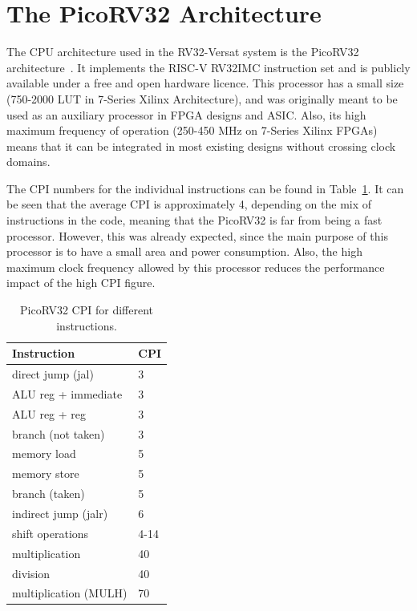 \section{The PicoRV32 Architecture}
\label{section:picorv32}

The \ac{CPU} architecture used in the RV32-Versat system is the PicoRV32
architecture~\cite{cliffordwolf:picorv32}. It implements the RISC-V RV32IMC
instruction set and is publicly available under a free and open hardware
licence. This processor has a small size (750-2000 \ac{LUT} in 7-Series Xilinx
Architecture), and was originally meant to be used as an auxiliary processor in
\ac{FPGA} designs and \ac{ASIC}. Also, its high maximum frequency of operation
(250-450 MHz on 7-Series Xilinx FPGAs) means that it can be integrated in most
existing designs without crossing clock domains.

The \ac{CPI} numbers for the individual instructions can be found in
Table~\ref{tab:cpi}. It can be seen that the average CPI is approximately 4,
depending on the mix of instructions in the code, meaning that the PicoRV32 is
far from being a fast processor. However, this was already expected, since the
main purpose of this processor is to have a small area and power
consumption. Also, the high maximum clock frequency allowed by this processor
reduces the performance impact of the high \ac{CPI} figure.

\begin{table}[!htbp]
	\renewcommand{\arraystretch}{1.2} %
	\caption{PicoRV32 CPI for different instructions.}
	\label{tab:cpi}
	\centering
	\begin{tabular}{ll}
		\toprule
		{\bf Instruction}   & {\bf \ac{CPI}} \\
		\midrule
		direct jump (jal)     &    3\\
		ALU reg + immediate   &    3\\
		ALU reg + reg         &    3\\
		branch (not taken) 	  &    3\\
		memory load           &    5\\
		memory store          &    5\\
		branch (taken)        &    5\\
		indirect jump (jalr)  &    6\\
		shift operations      & 4-14\\
		multiplication        &   40\\
		division              &   40\\
		multiplication (MULH) &   70\\
		\bottomrule
	\end{tabular}
\end{table}

